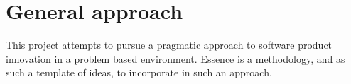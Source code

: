 
\section*{General approach}
\label{sec:general_approach}

This project attempts to pursue a pragmatic approach to software product innovation in a problem based environment. Essence  is a methodology, and as such a template of ideas, to incorporate in such an approach.   


